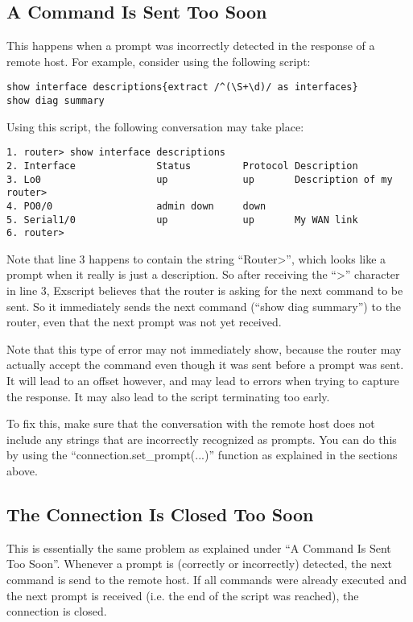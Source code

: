 \subsection{A Command Is Sent Too Soon}

This happens when a prompt was incorrectly detected in the response of a 
remote host. For example, consider using the following script:

\begin{lstlisting}
show interface descriptions{extract /^(\S+\d)/ as interfaces}
show diag summary
\end{lstlisting}

Using this script, the following conversation may take place:

\begin{lstlisting}
1. router> show interface descriptions
2. Interface              Status         Protocol Description
3. Lo0                    up             up       Description of my router>
4. PO0/0                  admin down     down     
5. Serial1/0              up             up       My WAN link
6. router> 
\end{lstlisting}

Note that line 3 happens to contain the string ``Router>'', which looks like 
a prompt when it really is just a description. So after receiving the ``>'' 
character in line 3, Exscript believes that the router is asking for the 
next command to be sent. So it immediately sends the next command (``show 
diag summary'') to the router, even that the next prompt was not yet received.

Note that this type of error may not immediately show, because the router may 
actually accept the command even though it was sent before a prompt was sent. 
It will lead to an offset however, and may lead to errors when trying to 
capture the response. It may also lead to the script terminating too early.

To fix this, make sure that the conversation with the remote host does 
not include any strings that are incorrectly recognized as prompts. You can 
do this by using the ``connection.set\_prompt(...)'' function as explained 
in the sections above.


\subsection{The Connection Is Closed Too Soon}

This is essentially the same problem as explained under ``A Command Is Sent 
Too Soon''. Whenever a prompt is (correctly or incorrectly) detected, 
the next command is send to the remote host.
If all commands were already executed and the next prompt is received (i.e. 
the end of the script was reached), the connection is closed.

